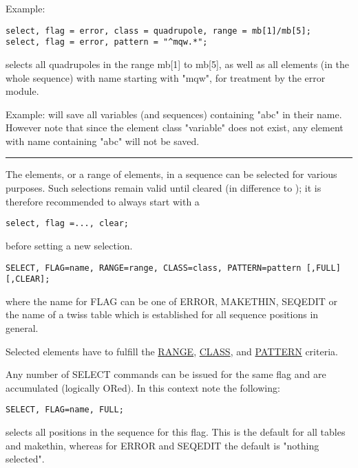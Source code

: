 Example: 
\begin{verbatim} 
select, flag = error, class = quadrupole, range = mb[1]/mb[5];
select, flag = error, pattern = "^mqw.*";
\end{verbatim}
selects all quadrupoles in the range mb[1] to mb[5], as well as all
elements (in the whole sequence) with name starting with "mqw", for 
treatment by the error module.  

Example:  
will save all variables (and sequences) containing "abc" in their name.
However note that since the element class "variable" does not exist, any
element with name containing "abc" will not be saved. 

\vskip 1cm
\hrule
\vskip 1cm


The elements, or a range of elements, in a sequence can be selected for
various purposes. Such selections remain valid until cleared (in
difference to \madeight); it is therefore recommended to always start with a  

\begin{verbatim}
select, flag =..., clear;
\end{verbatim} 
before setting a new selection. 
\begin{verbatim}
SELECT, FLAG=name, RANGE=range, CLASS=class, PATTERN=pattern [,FULL] [,CLEAR];
\end{verbatim} 
where the name for FLAG can be one of ERROR, MAKETHIN, SEQEDIT or the
name of a twiss table which is established for all sequence positions in
general.  

Selected elements have to fulfill the \href{ranges.html#range}{RANGE},
\href{ranges.html#class}{CLASS}, and \href{wildcard.html}{PATTERN}
criteria.  

Any number of SELECT commands can be issued for the same flag and are
accumulated (logically ORed). In this context note the following:  

\begin{verbatim}
SELECT, FLAG=name, FULL;
\end{verbatim} 
selects all positions in the sequence for this flag. This is the default
for all tables and makethin, whereas for ERROR and SEQEDIT the default
is "nothing selected".  

